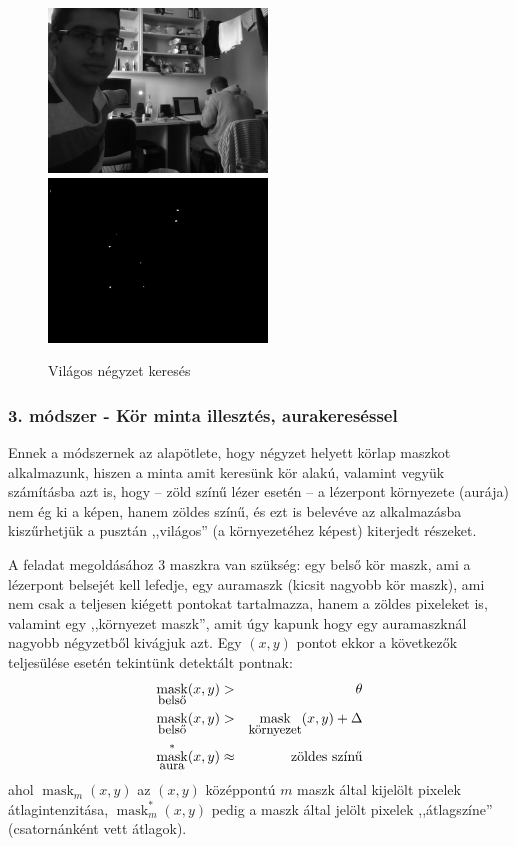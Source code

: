 \documentclass[a4paper,oneside]{article}
\DeclareMathOperator{\myMask}{mask}
\begin{document}
\begin{figure}[tbh]
  \centering
  \includegraphics[width=165pt]{figs/laser2-a.png} \hspace{5pt}  \includegraphics[width=165pt]{figs/laser2-b.png}
  \caption{Világos négyzet keresés \label{fig:laser2}}
\end{figure}

\subsubsection{3. módszer - Kör minta illesztés, aurakereséssel}

Ennek a módszernek az alapötlete, hogy négyzet helyett körlap maszkot alkalmazunk, hiszen a minta amit keresünk kör alakú, valamint vegyük számításba azt is, hogy -- zöld színű lézer esetén -- a lézerpont környezete (aurája) nem ég ki a képen, hanem zöldes színű, és ezt is belevéve az alkalmazásba kiszűrhetjük a pusztán ,,világos'' (a környezetéhez képest) kiterjedt részeket.

A feladat megoldásához 3 maszkra van szükség: egy belső kör maszk, ami a lézerpont belsejét kell lefedje, egy auramaszk (kicsit nagyobb kör maszk), ami nem csak a teljesen kiégett pontokat tartalmazza, hanem a zöldes pixeleket is, valamint egy ,,környezet maszk'', amit úgy kapunk hogy egy auramaszknál nagyobb négyzetből kivágjuk azt. Egy $(x,y)$ pontot ekkor a következők teljesülése esetén tekintünk detektált pontnak:
\begin{eqnarray}
 \myMask_{\hbox{\small belső}}(x, y) & > & \theta \\
 \myMask_{\hbox{\small belső}}(x, y) & > & \myMask_{\hbox{\small környezet}}(x, y) + \Delta \\
 \myMask^*_{\hbox{\small aura}}(x, y) & \approx & \hbox{zöldes színű}
\end{eqnarray}
ahol $\myMask_m(x, y)$ az $(x, y)$ középpontú $m$ maszk által kijelölt pixelek átlagintenzitása, $\myMask^*_m(x, y)$ pedig a maszk által jelölt pixelek ,,átlagszíne'' (csatornánként vett átlagok).
\end{document}
